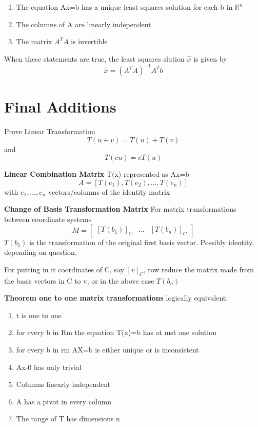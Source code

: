 \begin{enumerate}
	\item The equation Ax=b has a unique least squares solution for each b in $\mathbb{R}^{n}$
	\item The columns of A are linearly independent
	\item The matrix $A^{T}A$ is invertible
\end{enumerate}
When these statements are true, the least squares slution $\hat x$ is given by
\begin{equation}
	\label{}
\hat x =(A^{T}A)^{-1}A^{T}b	
\end{equation}

\section{Final Additions}

Prove Linear Transformation
\begin{equation}
	\label{}
	T(u+v)=T(u)+T(v)
\end{equation}
and
\begin{equation}
	\label{}
	T(cu)=cT(u)
\end{equation}

\hfill
\hfill

\textbf{Linear Combination Matrix}
T(x) represented as Ax=b
\begin{equation}
	\label{}
	A=[T(e_{1}), T(e_{2}),\ldots, T(e_{n})]	
\end{equation}
with $e_{1},\ldots,e_{n}$ vectors/columns of the identity matrix

\hfill
\hfill

\textbf{Change of Basis Transformation Matrix}
For matrix transformations between coordinate systems
\begin{equation}
	\label{}
M=
\begin{bmatrix}
	[T(b_{1})]_{C}&\ldots&[T(b_{n})]_{C}	
\end{bmatrix}
\end{equation}
$T(b_{1})$ is the transformation of the original first basis vector. Possibly identity, depending on question. 

For putting in it coordinates of C, say $[v]_{C}$, row reduce the matrix made from the basis vectors in C to v, or in the above case $T(b_{n})$

\hfill
\hfill

\textbf{Theorem one to one matrix transformations}
logically equivalent: 
\begin{enumerate}
	\item t is one to one
	\item for every b in Rm the equation T(x)=b has at mst one solution
	\item for every b in rm AX=b is either unique or is inconsistent 
	\item Ax-0 has only trivial
	\item Columns linearly independent
	\item A has a pivot in every column
	\item The range of T has dimensions n
\end{enumerate}

